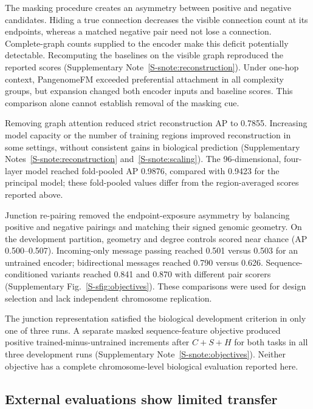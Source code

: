 \documentclass[11pt]{article}
\newcommand{\method}{PangenomeFM\xspace}
\begin{document}
\begin{bibunit}[unsrtnat]
The masking procedure creates an asymmetry between positive and negative candidates. Hiding a true connection decreases the visible connection count at its endpoints, whereas a matched negative pair need not lose a connection. Complete-graph counts supplied to the encoder make this deficit potentially detectable. Recomputing the baselines on the visible graph reproduced the reported scores (Supplementary Note~\ref{S-snote:reconstruction}). Under one-hop context, \method exceeded preferential attachment in all complexity groups, but expansion changed both encoder inputs and baseline scores. This comparison alone cannot establish removal of the masking cue.

Removing graph attention reduced strict reconstruction AP to 0.7855. Increasing model capacity or the number of training regions improved reconstruction in some settings, without consistent gains in biological prediction (Supplementary Notes~\ref{S-snote:reconstruction} and~\ref{S-snote:scaling}). The 96-dimensional, four-layer model reached fold-pooled AP 0.9876, compared with 0.9423 for the principal model; these fold-pooled values differ from the region-averaged scores reported above.

Junction re-pairing removed the endpoint-exposure asymmetry by balancing positive and negative pairings and matching their signed genomic geometry. On the development partition, geometry and degree controls scored near chance (AP 0.500--0.507). Incoming-only message passing reached 0.501 versus 0.503 for an untrained encoder; bidirectional messages reached 0.790 versus 0.626. Sequence-conditioned variants reached 0.841 and 0.870 with different pair scorers (Supplementary Fig.~\ref{S-sfig:objectives}). These comparisons were used for design selection and lack independent chromosome replication.

The junction representation satisfied the biological development criterion in only one of three runs. A separate masked sequence-feature objective\cite{hou2022graphmae} produced positive trained-minus-untrained increments after $C+S+H$ for both tasks in all three development runs (Supplementary Note~\ref{S-snote:objectives}). Neither objective has a complete chromosome-level biological evaluation reported here.



\subsection{External evaluations show limited transfer}
\label{sec:generalization-result}


\end{bibunit}
\end{document}
